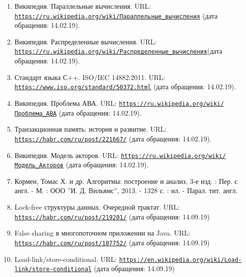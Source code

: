 {\begin{enumerate}
		\item Википедия. Параллельные вычисления. URL: \href{https://ru.wikipedia.org/wiki/%D0%9F%D0%B0%D1%80%D0%B0%D0%BB%D0%BB%D0%B5%D0%BB%D1%8C%D0%BD%D1%8B%D0%B5_%D0%B2%D1%8B%D1%87%D0%B8%D1%81%D0%BB%D0%B5%D0%BD%D0%B8%D1%8F}{\nolinkurl{https://ru.wikipedia.org/wiki/Параллельные_вычисления}} (дата обращения: 14.02.19).
		\item Википедия. Распределенные вычисления. URL: \href{https://ru.wikipedia.org/wiki/%D0%A0%D0%B0%D1%81%D0%BF%D1%80%D0%B5%D0%B4%D0%B5%D0%BB%D1%91%D0%BD%D0%BD%D1%8B%D0%B5_%D0%B2%D1%8B%D1%87%D0%B8%D1%81%D0%BB%D0%B5%D0%BD%D0%B8%D1%8F}{\nolinkurl{https://ru.wikipedia.org/wiki/Распределенные_вычисления}}(дата обращения: 14.02.19).
		\item Стандарт языка С++. ISO/IEC 14882:2011. URL: \href{https://www.iso.org/standard/50372.html}{\nolinkurl{https://www.iso.org/standard/50372.html}} (дата обращения: 14.02.19).
		\item Википедия. Проблема АВА. URL: \href{https://ru.wikipedia.org/wiki/%D0%9F%D1%80%D0%BE%D0%B1%D0%BB%D0%B5%D0%BC%D0%B0_ABA}{\nolinkurl{https://ru.wikipedia.org/wiki/Проблема_АВА}} (дата обращения: 14.02.19).
		\item Транзакционная память: история и развитие. URL: \href{https://habr.com/ru/post/221667/}{\nolinkurl{https://habr.com/ru/post/221667/}} (дата обращения: 14.02.19).
		\item Википедия. Модель акторов. URL: \href{https://ru.wikipedia.org/wiki/}{\nolinkurl{https://ru.wikipedia.org/wiki/Модель_Акторов}} (дата обращения: 14.02.19).
		\item Кормен, Томас Х. и др. Алгоритмы: построение и анализ, 3-е изд. : Пер. с англ. - М. : ООО ''И. Д. Вильямс'', 2013. - 1328 с. : ил. - Парал. тит. англ.
		\item Lock-free структуры данных. Очередной трактат. URL: \href{https://habr.com/ru/post/219201/}{\nolinkurl{https://habr.com/ru/post/219201/}} (дата обращения: 14.09.19)
		\item False sharing в многопоточном приложении на Java. URL: \href{https://habr.com/ru/post/187752/}{\nolinkurl{https://habr.com/ru/post/187752/}} (дата обращения: 14.09.19)
		\item Load-link/store-conditional. URL: \href{https://en.wikipedia.org/wiki/Load-link/store-conditional}{\nolinkurl{https://en.wikipedia.org/wiki/Load-link/store-conditional}} (дата обращения: 14.09.19)

\end{enumerate}}
